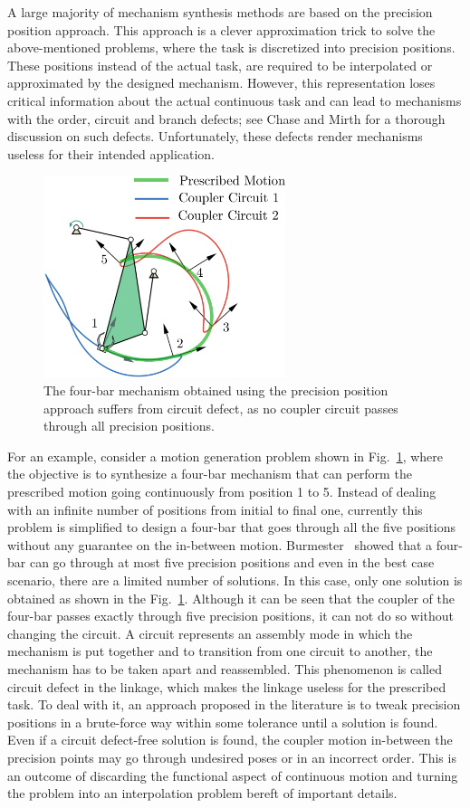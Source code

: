 \documentclass[twocolumn,10pt]{asme2ej}
\begin{document}
A large majority of mechanism synthesis methods are based on the precision position approach.
This approach is a clever approximation trick to solve the above-mentioned problems, where the task is discretized into precision positions. These positions instead of the actual task, are required to be interpolated or approximated by the designed mechanism. However, this representation loses critical information about the actual continuous task and can lead to mechanisms with the order, circuit and branch defects; see Chase and Mirth\cite{chasemirth} for a thorough discussion on such defects. Unfortunately, these defects render mechanisms useless for their intended application.
\begin{figure}
\centering
\includegraphics[width=200pt]{figure/fig_circuit_defect.eps}
  \caption{The four-bar mechanism obtained using the precision position approach suffers from circuit defect, as no coupler circuit passes through all precision positions.}
\label{circuit_defect}
\end{figure}
For an example, consider a motion generation problem shown in Fig.~\ref{circuit_defect}, where the objective is to synthesize a four-bar mechanism that can perform the prescribed motion going continuously from position 1 to 5. Instead of dealing with an infinite number of positions from initial to final one, currently this problem is simplified to design a four-bar that goes through all the five positions without any guarantee on the in-between motion. Burmester~\cite{Burmester86} showed that a four-bar can go through at most five precision positions and even in the best case scenario, there are a limited number of solutions. In this case, only one solution is obtained as shown in the Fig.~\ref{circuit_defect}. Although it can be seen that the coupler of the four-bar passes exactly through five precision positions, it can not do so without changing the circuit.
A circuit represents an assembly mode in which the mechanism is put together and to transition from one circuit to another, the mechanism has to be taken apart and reassembled. This phenomenon is called circuit defect in the linkage, which makes the linkage useless for the prescribed task.
To deal with it, an approach proposed in the literature is to tweak precision positions in a brute-force way within some tolerance until a solution is found.
Even if a circuit defect-free solution is found, the coupler motion in-between the precision points may go through undesired poses or in an incorrect order. This is an outcome of discarding the functional aspect of continuous motion and turning the problem into an interpolation problem bereft of important details. 
\end{document}
